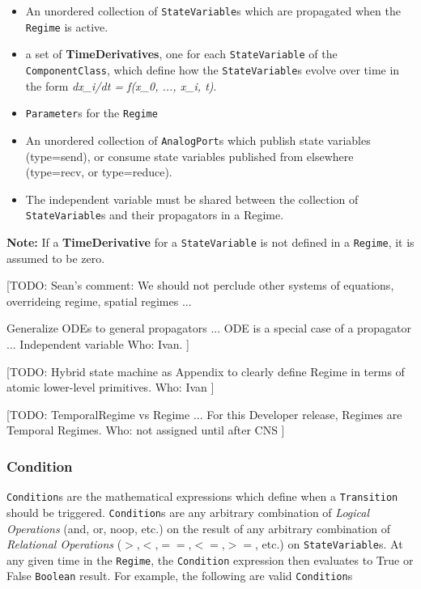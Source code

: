 \documentclass{article}
\newcommand{\note}[1]{%
\begin{center}
\colorbox{issuecolor}{\parbox{0.8\linewidth}{\textbf{Note:} #1}}
\end{center}%
}
\newcommand{\nmlClass}[1]{{\tt #1}}
\begin{document}
\begin{itemize}
\item An unordered collection of \nmlClass{StateVariable}s which are
propagated when the \nmlClass{Regime} is active.
\item a set of \textbf{TimeDerivatives}, one for each {\tt StateVariable}
of the {\tt ComponentClass}, which define how the {\tt StateVariable}s
evolve over time in the form \textsl{dx\_i/dt = f(x\_0, ..., x\_i, t)}.
\item {\tt Parameter}s for the \nmlClass{Regime}
\item An unordered collection of \nmlClass{AnalogPort}s which publish state
variables (type=send), or consume state variables published from elsewhere
(type=recv, or type=reduce).
\item The independent variable must be shared between the collection
of {\tt StateVariable}s and their propagators in a Regime.
\end{itemize}

\note{If a \textbf{TimeDerivative} for a {\tt StateVariable} is not defined
in a {\tt Regime}, it is assumed to be zero.}

[TODO:
Sean's comment:
We should not perclude other systems of equations,
overrideing regime, spatial regimes ...

Generalize ODEs to general propagators ...
ODE is a special case of a propagator ...
Independent variable
Who: Ivan.
]

[TODO: Hybrid state machine as Appendix to clearly define Regime
in terms of atomic lower-level primitives.
Who: Ivan
]

[TODO:
TemporalRegime vs Regime ...
For this Developer release, Regimes are Temporal Regimes.
Who: not assigned until after CNS
]

\subsubsection{Condition}

\nmlClass{Condition}s are the mathematical expressions which define
when a \nmlClass{Transition} should be triggered.
\nmlClass{Condition}s are any arbitrary combination of \emph{Logical
Operations} (and, or, noop, etc.) on the
result of any arbitrary combination of \emph{Relational Operations}
($>$,$<$,$==$,$<=$,$>=$, etc.) on
\nmlClass{StateVariable}s. At any given time in the \nmlClass{Regime},
the \nmlClass{Condition} expression then evaluates to True or False
{\tt Boolean} result. For example, the following are valid
\nmlClass{Condition}s
\end{document}
